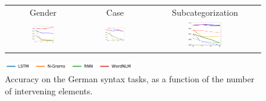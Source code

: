 
\begin{figure}
	\begin{tabular}{ccc}
Gender & Case & Subcategorization \\
\includegraphics[width=0.33\textwidth]{figures/german-gender-total.pdf} 
		&
		\includegraphics[width=0.33\textwidth]{figures/german-case-total.pdf}
		&
\includegraphics[width=0.33\textwidth]{figures/german-prep-with-control.pdf}
	\end{tabular}
\centering\includegraphics[width=0.5\textwidth]{figures/german-legend.pdf}
\caption{Accuracy on the German syntax tasks, as a function of the number of intervening elements.}\label{fig:german-syntax}
\end{figure}



